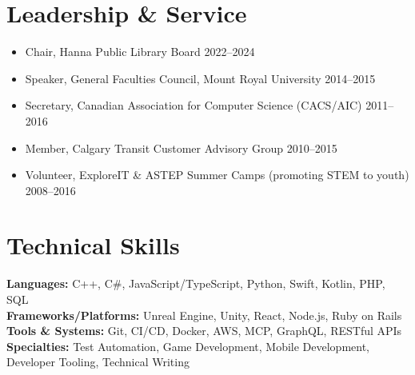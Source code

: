 \documentclass[11pt]{article}
\begin{document}
\section*{Leadership \& Service}
\begin{itemize}[nosep,leftmargin=*]
    \item Chair, Hanna Public Library Board \hfill 2022--2024
    \item Speaker, General Faculties Council, Mount Royal University \hfill 2014--2015
    \item Secretary, Canadian Association for Computer Science (CACS/AIC) \hfill 2011--2016
    \item Member, Calgary Transit Customer Advisory Group \hfill 2010--2015
    \item Volunteer, ExploreIT \& ASTEP Summer Camps (promoting STEM to youth) \hfill 2008--2016
\end{itemize}

\section*{Technical Skills}
\textbf{Languages:} C++, C\#, JavaScript/TypeScript, Python, Swift, Kotlin, PHP, SQL \\
\textbf{Frameworks/Platforms:} Unreal Engine, Unity, React, Node.js, Ruby on Rails \\
\textbf{Tools \& Systems:} Git, CI/CD, Docker, AWS, MCP, GraphQL, RESTful APIs \\
\textbf{Specialties:} Test Automation, Game Development, Mobile Development, Developer Tooling, Technical Writing
\end{document}
